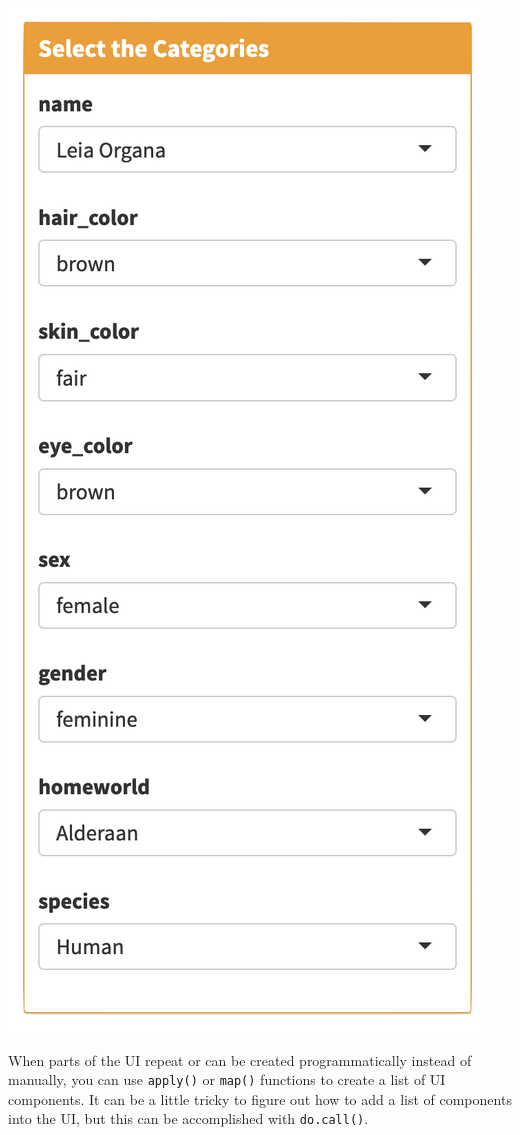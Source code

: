 \documentclass[
]{book}
\begin{document}
\includegraphics{images/structure_ui.png}

When parts of the UI repeat or can be created programmatically instead of manually, you can use \texttt{apply()} or \texttt{map()} functions to create a list of UI components. It can be a little tricky to figure out how to add a list of components into the UI, but this can be accomplished with \texttt{do.call()}.
\end{document}
